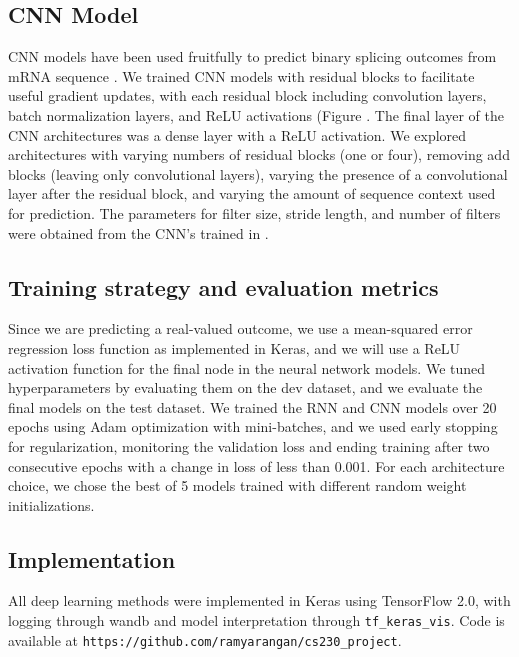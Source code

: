 \documentclass{article}
\begin{document}
\subsection{CNN Model}
CNN models have been used fruitfully to predict binary splicing outcomes from mRNA sequence \cite{spliceai}. We trained CNN models with residual blocks to facilitate useful gradient updates, with each residual block including convolution layers, batch normalization layers, and ReLU activations (Figure . The final layer of the CNN architectures was a dense layer with a ReLU activation. We explored architectures with varying numbers of residual blocks (one or four), removing add blocks (leaving only convolutional layers), varying the presence of a convolutional layer after the residual block, and varying the amount of sequence context used for prediction. The parameters for filter size, stride length, and number of filters were obtained from the CNN's trained in \cite{spliceai}.
\subsection{Training strategy and evaluation metrics}
Since we are predicting a real-valued outcome, we use a mean-squared error regression loss function as implemented in Keras, and we will use a ReLU activation function for the final node in the neural network models. We tuned hyperparameters by evaluating them on the dev dataset, and we evaluate the final models on the test dataset. We trained the RNN and CNN models over 20 epochs using Adam optimization with mini-batches, and we used early stopping for regularization, monitoring the validation loss and ending training after two consecutive epochs with a change in loss of less than 0.001. For each architecture choice, we chose the best of 5 models trained with different random weight initializations. 
\subsection{Implementation} 
All deep learning methods were implemented in Keras using TensorFlow 2.0, with logging through wandb and model interpretation through \texttt{tf\_keras\_vis}. Code is available at \texttt{https://github.com/ramyarangan/cs230\_project}.
\end{document}
